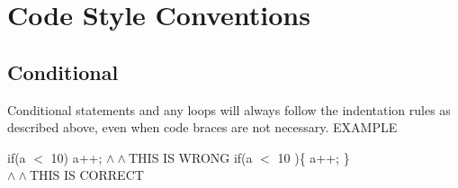 \documentclass{article}
\begin{document}
\section{Code Style Conventions}
\subsection{Conditional}
Conditional statements and any loops will always follow the indentation rules as described above, even when code braces are not necessary. \newline 
EXAMPLE 
\newline 

if(a $<$ 10) \newline
\hspace*{1cm}a++; \newline \newline
$\wedge \wedge $THIS IS WRONG \newline 
\newline
if(a $<$ 10 )\{ \newline
\hspace*{1cm}a++; \newline 
\}\\
$\wedge \wedge $THIS IS CORRECT \newline 
\end{document}
